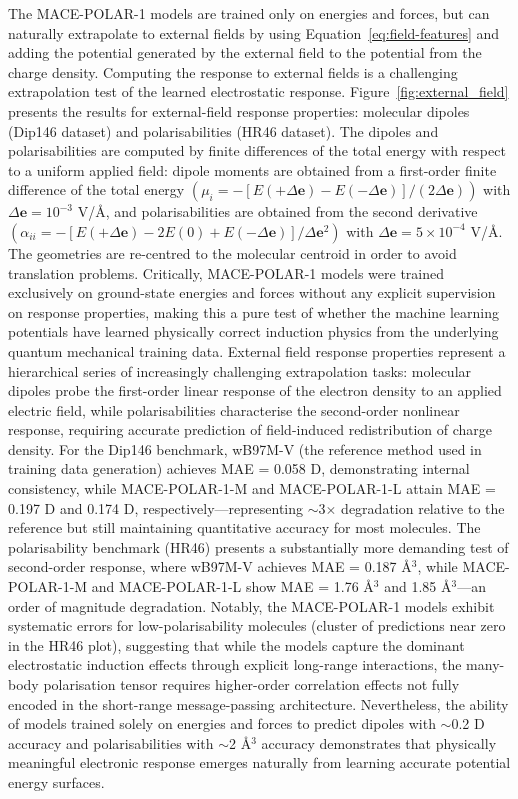 \documentclass[aps,%
superscriptaddress,
 amsmath,amssymb,
floatfix,
twocolumn
]{revtex4-2}
\newcommand{\MFP}{MACE-POLAR-1 }
\newcommand{\MFPM}{MACE-POLAR-1-M }
\newcommand{\MFPL}{MACE-POLAR-1-L }
\begin{document}
The \MFP models are trained only on energies and forces, but can naturally extrapolate to external fields by using Equation~\ref{eq:field-features} and adding the potential generated by the external field to the potential from the charge density. Computing the response to external fields is a challenging extrapolation test of the learned electrostatic response.
Figure~\ref{fig:external_field} presents the results for external-field response properties: molecular dipoles (Dip146 dataset) and polarisabilities (HR46 dataset). The dipoles and polarisabilities are computed by finite differences of the total energy with respect to a uniform applied field: dipole moments are obtained from a first-order finite difference of the total energy $(\mu_i = -[E(+\Delta \mathbf{e})-E(-\Delta \mathbf{e})]/(2\Delta \mathbf{e}))$ with $\Delta \mathbf{e}=10^{-3}$ V/Å, and polarisabilities are obtained from the second derivative $(\alpha_{ii} = -[E(+\Delta \mathbf{e})-2E(0)+E(-\Delta \mathbf{e})]/ \Delta \mathbf{e}^2)$ with $\Delta \mathbf{e}=5\times10^{-4}$ V/Å. The geometries are re-centred to the molecular centroid in order to avoid translation problems. Critically, \MFP models were trained exclusively on ground-state
energies and forces without any explicit supervision on response properties, making this a pure test of whether the machine learning potentials have learned physically correct induction physics from the underlying quantum mechanical
training data. External field response properties represent a hierarchical series of increasingly challenging extrapolation tasks: molecular dipoles probe the first-order linear response of the electron density to an applied electric field, while polarisabilities characterise the second-order nonlinear response, requiring accurate prediction of field-induced redistribution of charge density. For the Dip146 benchmark, wB97M-V (the reference method used in training data generation) achieves MAE = 0.058 D, demonstrating internal consistency, while \MFPM and \MFPL attain MAE = 0.197 D and 0.174 D, respectively—representing $\sim$3$\times$ degradation relative to the reference but still maintaining quantitative accuracy for most molecules. The polarisability benchmark (HR46) presents a substantially more demanding test of second-order response, where wB97M-V achieves MAE = 0.187 Å$^3$, while \MFPM and \MFPL show MAE = 1.76 Å$^3$ and 1.85 Å$^3$—an order of magnitude degradation. Notably, the \MFP models exhibit systematic errors for low-polarisability molecules (cluster of predictions near zero in the HR46 plot), suggesting that while the models capture the dominant electrostatic induction effects through explicit long-range interactions, the many-body polarisation tensor requires higher-order correlation effects not fully encoded in the short-range message-passing architecture. Nevertheless, the ability of models trained solely on energies and forces to predict dipoles with $\sim$0.2 D accuracy and polarisabilities with $\sim$2 Å$^3$ accuracy demonstrates that physically meaningful electronic response emerges naturally from learning accurate potential energy surfaces.
\end{document}
